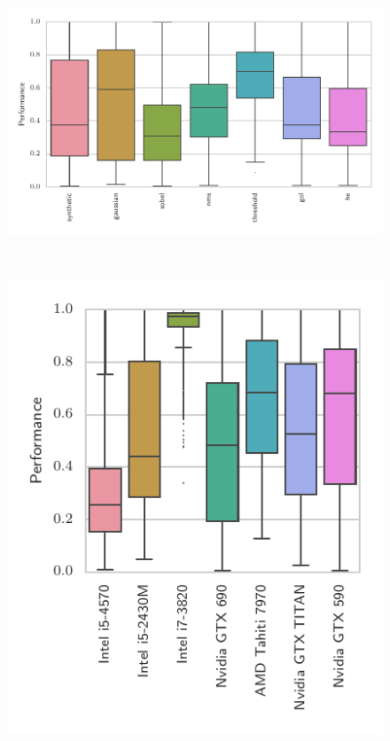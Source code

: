 \begin{subfigure}[h]{\textwidth}
\centering
\includegraphics{img/performance_kernels.pdf}
\vspace{-1.5em} %
\caption{}
\label{fig:performance-kernels}
\end{subfigure}
\\
\begin{subfigure}[h]{.48\textwidth}
\centering
\includegraphics{img/performance_devices.pdf}
\vspace{-1.5em} %
\caption{}
\label{fig:performance-devices}
\end{subfigure}
